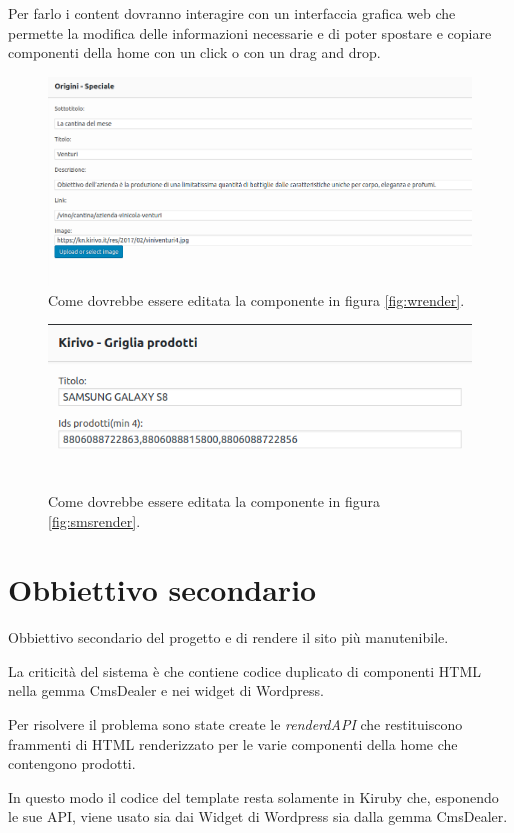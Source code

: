 Per farlo i content dovranno interagire con un interfaccia grafica web che permette
la modifica delle informazioni necessarie e di poter spostare e copiare
componenti della home con un click o con un drag and drop.


\begin{figure}
  \includegraphics[width=\textwidth]{figure/wform.png}
  \caption{Come dovrebbe essere editata la componente in figura \ref{fig:wrender}.}
  \label{fig:meseform}
\end{figure}

\begin{figure}
  \includegraphics[width=\textwidth]{figure/sms-form.png}
  \caption{Come dovrebbe essere editata la componente in figura \ref{fig:smsrender}.}
  \label{fig:smsform}
\end{figure}

\section{Obbiettivo secondario}
Obbiettivo secondario del progetto e di rendere il sito più manutenibile.

La criticità del sistema è che contiene codice duplicato di componenti HTML nella gemma CmsDealer 
e nei widget di Wordpress. 

Per risolvere il problema sono state create le  \emph{renderdAPI} 
che restituiscono frammenti di HTML renderizzato per le varie componenti della home che contengono prodotti.

In questo modo il codice del template resta solamente in Kiruby che, esponendo le sue
API, viene usato sia dai Widget di Wordpress sia dalla gemma CmsDealer.